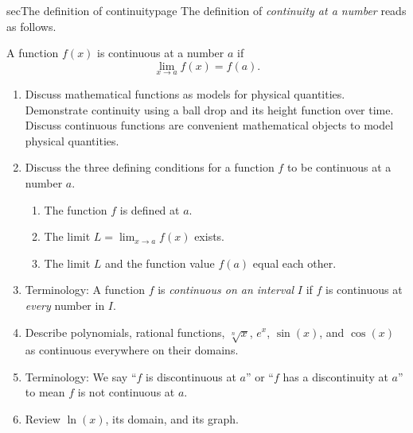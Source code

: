 \documentclass[../main]{subfiles}
\begin{document}
%
%
\begin{outline}{sec}{The definition of continuity}{page}
  \label{act:definition}
  The definition of \emph{continuity at a number} reads as follows.
  \begin{mdframed}[style=simple]
    A function \(f(x)\) is continuous at a number \(a\) if
    \begin{equation} \label{eq:continuity}
      \lim_{x \to a} f(x) = f(a).
    \end{equation}
  \end{mdframed}

  \begin{enumerate}
    \item Discuss mathematical functions as models for physical quantities. Demonstrate continuity using a ball drop and its height function over time.  Discuss continuous functions are convenient mathematical objects to model physical quantities.
    \item Discuss the three defining conditions for a function \(f\) to be continuous at a number \(a\).
          \begin{enumerate}
            \item The function \(f\) is defined at \(a\). %
            \item The limit \(L = \lim_{x \to a} f(x)\) exists. %
            \item The limit \(L\) and the function value \(f(a)\) equal each other. %
          \end{enumerate}
    \item Terminology: A function \(f\) is \textit{continuous on an interval} \(I\) if \(f\) is continuous at \emph{every} number in \(I\).
    \item Describe polynomials, rational functions, \(\sqrt[n]{x}\), \(e^{x}\), \(\sin(x)\), and \(\cos(x)\) as continuous everywhere on their domains.

    \item Terminology: We say ``\(f\) is discontinuous at \(a\)'' or ``\(f\) has a discontinuity at \(a\)'' to mean \(f\) is not continuous at \(a\).
    \item Review \(\ln(x)\), its domain, and its graph.


\end{enumerate}
\end{outline}
\end{document}
